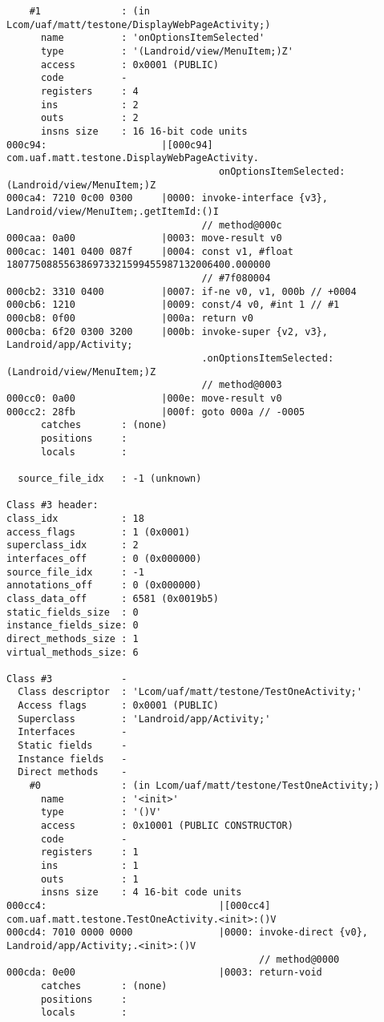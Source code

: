 \begin{lstlisting}
    #1              : (in Lcom/uaf/matt/testone/DisplayWebPageActivity;)
      name          : 'onOptionsItemSelected'
      type          : '(Landroid/view/MenuItem;)Z'
      access        : 0x0001 (PUBLIC)
      code          -
      registers     : 4
      ins           : 2
      outs          : 2
      insns size    : 16 16-bit code units
000c94:                    |[000c94] com.uaf.matt.testone.DisplayWebPageActivity.
                                     onOptionsItemSelected:(Landroid/view/MenuItem;)Z
000ca4: 7210 0c00 0300     |0000: invoke-interface {v3}, Landroid/view/MenuItem;.getItemId:()I
                                  // method@000c
000caa: 0a00               |0003: move-result v0
000cac: 1401 0400 087f     |0004: const v1, #float 180775088556386973321599455987132006400.000000
                                  // #7f080004
000cb2: 3310 0400          |0007: if-ne v0, v1, 000b // +0004
000cb6: 1210               |0009: const/4 v0, #int 1 // #1
000cb8: 0f00               |000a: return v0
000cba: 6f20 0300 3200     |000b: invoke-super {v2, v3}, Landroid/app/Activity;
                                  .onOptionsItemSelected:(Landroid/view/MenuItem;)Z
                                  // method@0003
000cc0: 0a00               |000e: move-result v0
000cc2: 28fb               |000f: goto 000a // -0005
      catches       : (none)
      positions     :
      locals        :

  source_file_idx   : -1 (unknown)

Class #3 header:
class_idx           : 18
access_flags        : 1 (0x0001)
superclass_idx      : 2
interfaces_off      : 0 (0x000000)
source_file_idx     : -1
annotations_off     : 0 (0x000000)
class_data_off      : 6581 (0x0019b5)
static_fields_size  : 0
instance_fields_size: 0
direct_methods_size : 1
virtual_methods_size: 6

Class #3            -
  Class descriptor  : 'Lcom/uaf/matt/testone/TestOneActivity;'
  Access flags      : 0x0001 (PUBLIC)
  Superclass        : 'Landroid/app/Activity;'
  Interfaces        -
  Static fields     -
  Instance fields   -
  Direct methods    -
    #0              : (in Lcom/uaf/matt/testone/TestOneActivity;)
      name          : '<init>'
      type          : '()V'
      access        : 0x10001 (PUBLIC CONSTRUCTOR)
      code          -
      registers     : 1
      ins           : 1
      outs          : 1
      insns size    : 4 16-bit code units
000cc4:                              |[000cc4] com.uaf.matt.testone.TestOneActivity.<init>:()V
000cd4: 7010 0000 0000               |0000: invoke-direct {v0}, Landroid/app/Activity;.<init>:()V
                                            // method@0000
000cda: 0e00                         |0003: return-void
      catches       : (none)
      positions     :
      locals        :


\end{lstlisting}
